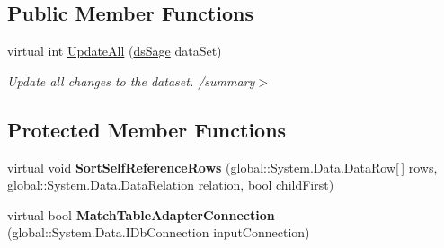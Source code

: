 \subsection*{Public Member Functions}
\begin{DoxyCompactItemize}
\item 
virtual int \hyperlink{class_products_1_1_data_1_1ds_sage_table_adapters_1_1_table_adapter_manager_a83a9cdd2554ff5bdb399090e87f1d7a5}{Update\+All} (\hyperlink{class_products_1_1_data_1_1ds_sage}{ds\+Sage} data\+Set)\hypertarget{class_products_1_1_data_1_1ds_sage_table_adapters_1_1_table_adapter_manager_a83a9cdd2554ff5bdb399090e87f1d7a5}{}\label{class_products_1_1_data_1_1ds_sage_table_adapters_1_1_table_adapter_manager_a83a9cdd2554ff5bdb399090e87f1d7a5}

\begin{DoxyCompactList}\small\item\em Update all changes to the dataset. /summary$>$ \end{DoxyCompactList}\end{DoxyCompactItemize}
\subsection*{Protected Member Functions}
\begin{DoxyCompactItemize}
\item 
virtual void {\bfseries Sort\+Self\+Reference\+Rows} (global\+::\+System.\+Data.\+Data\+Row\mbox{[}$\,$\mbox{]} rows, global\+::\+System.\+Data.\+Data\+Relation relation, bool child\+First)\hypertarget{class_products_1_1_data_1_1ds_sage_table_adapters_1_1_table_adapter_manager_ae41d87f4fae71956ca1b86fbe23959e6}{}\label{class_products_1_1_data_1_1ds_sage_table_adapters_1_1_table_adapter_manager_ae41d87f4fae71956ca1b86fbe23959e6}

\item 
virtual bool {\bfseries Match\+Table\+Adapter\+Connection} (global\+::\+System.\+Data.\+I\+Db\+Connection input\+Connection)\hypertarget{class_products_1_1_data_1_1ds_sage_table_adapters_1_1_table_adapter_manager_a59c8015f8c9f45e3b57458d5ac84e628}{}\label{class_products_1_1_data_1_1ds_sage_table_adapters_1_1_table_adapter_manager_a59c8015f8c9f45e3b57458d5ac84e628}

\end{DoxyCompactItemize}
